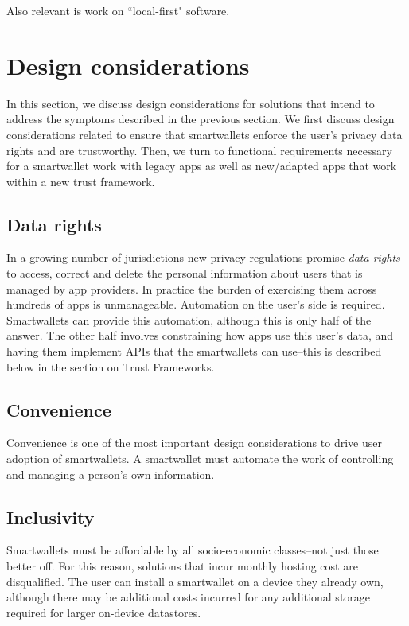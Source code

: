 \documentclass[11pt, oneside]{article}   	%
\begin{document}
Also relevant is work on ``local-first" software.\cite{Kleppmann2019}

\section{Design considerations} %

In this section, we discuss design considerations for solutions that intend to address the symptoms described in the previous section. We first discuss design considerations related to ensure that smartwallets enforce the user's privacy data rights and are trustworthy. Then, we turn to functional requirements necessary for a smartwallet work with legacy apps as well as new/adapted apps that work within a new trust framework.

\subsection{Data rights}

In a growing number of jurisdictions new privacy regulations promise \emph{data rights} to access, correct and delete the personal information about users that is managed by app providers. In practice the burden of exercising them across hundreds of apps is unmanageable. Automation on the user's side is required. Smartwallets can provide this automation, although this is only half of the answer. The other half involves constraining how apps use this user's data, and having them implement APIs that the smartwallets can use--this is described below in the section on Trust Frameworks.

\subsection{Convenience}

Convenience is one of the most important design considerations to drive user adoption of smartwallets. A smartwallet must automate the work of controlling and managing a person's own information. 

\subsection{Inclusivity}

Smartwallets must be affordable by all socio-economic classes--not just those better off. For this reason, solutions that incur monthly hosting cost are disqualified. The user can install a smartwallet on a device they already own, although there may be additional costs incurred for any additional storage required for larger on-device datastores.
\end{document}
